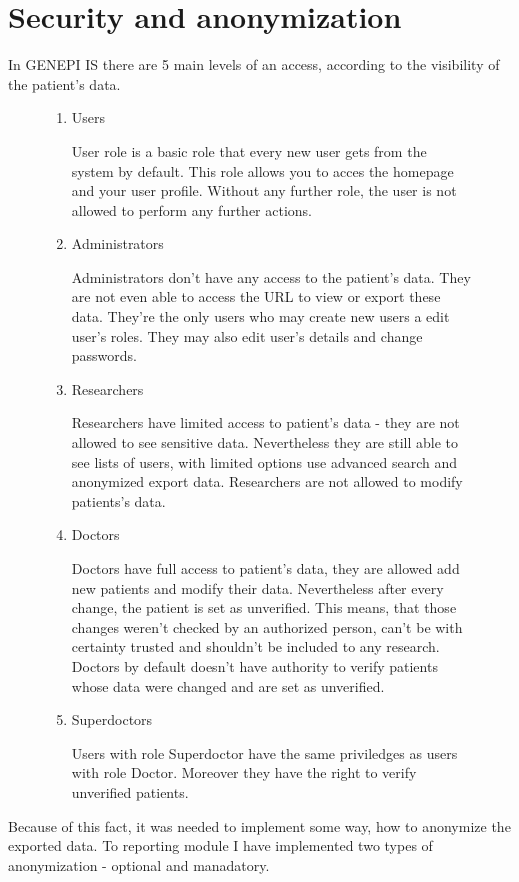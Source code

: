 \documentclass[thesis=B,english]{FITthesis}[2012/10/20]
\begin{document}
\section{Security and anonymization}
In GENEPI IS there are 5 main levels of an access, according to the visibility of the patient's data.
\begin{figure}[ht]
	\begin{enumerate}
	\item{Users}
	
	User role is a basic role that every new user gets from the system by default. This role allows you to acces the homepage 	and your user profile. Without any further role, the user is not allowed to perform any further actions.

	\item{Administrators}

	Administrators don't have any access to the patient's data. They are not even able to access the URL to view or export 			these data. They're the only users who may create new users a edit user's roles. They may also edit user's details and change passwords.
	\item{Researchers}

	Researchers have limited access to patient's data - they are not allowed to see sensitive data. Nevertheless they are 			still able to see lists of users, with limited options use advanced search and anonymized export data. Researchers are 			not allowed to modify patients's data.
	\item{Doctors}

	Doctors have full access to patient's data, they are allowed add new patients and modify their data. Nevertheless after every change, the patient is set as unverified. This means, that those changes weren't checked by an authorized person, can't be with certainty trusted and shouldn't be included to any research. Doctors by default doesn't have authority to verify patients whose data were changed and are set as unverified.

	\item{Superdoctors}

	Users with role Superdoctor have the same priviledges as users with role Doctor. Moreover they have the right to verify 		unverified patients.

	\end{enumerate}
\end{figure}

Because of this fact, it was needed to implement some way, how to anonymize the exported data. To reporting module I have implemented two types of anonymization - optional and manadatory.
\end{document}
